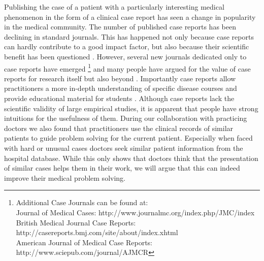 Publishing the case of a patient with a particularly interesting medical phenomenon in the form of a clinical case report has seen a change in popularity in the medical community.
The number of published case reports has been declining in standard journals. This has happened not only because case reports can hardly contribute to a good impact factor, but also because their scientific benefit has been questioned \citep{Mason2001}. However, several new journals dedicated only to case reports have emerged \citep{Kidd2007}\footnote{Additional Case Journals can be found at:\\Journal of Medical Cases: http://www.journalmc.org/index.php/JMC/index\\British Medical Journal Case Reports: http://casereports.bmj.com/site/about/index.xhtml\\American Journal of Medical Case Reports: http://www.sciepub.com/journal/AJMCR} and many people have argued for the value of case reports for research itself but also beyond \citep{Williams2003,Dib2008,Sandu2016}. Importantly case reports allow practitioners a more in-depth understanding of specific disease courses and provide educational material for students \citep{Nissen2014}. Although case reports lack the scientific validity of large empirical studies, it is apparent that people have strong intuitions for the usefulness of them. During our collaboration with practicing doctors we also found that practitioners use the clinical records of similar patients to guide problem solving for the current patient. Especially when faced with hard or unusual cases doctors seek similar patient information from the hospital database. While this only shows that doctors think that the presentation of similar cases helps them in their work, we will argue that this can indeed improve their medical problem solving. 

